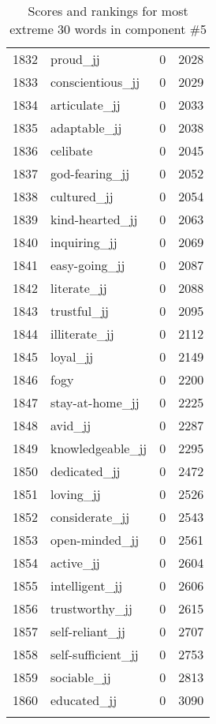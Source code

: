 \begin{longtable}[!htbp]{| rlr@{.}l |}
    1832 & proud\_jj & 0 & 2028 \\
    1833 & conscientious\_jj & 0 & 2029 \\
    1834 & articulate\_jj & 0 & 2033 \\
    1835 & adaptable\_jj & 0 & 2038 \\
    1836 & celibate & 0 & 2045 \\
    1837 & god-fearing\_jj & 0 & 2052 \\
    1838 & cultured\_jj & 0 & 2054 \\
    1839 & kind-hearted\_jj & 0 & 2063 \\
    1840 & inquiring\_jj & 0 & 2069 \\
    1841 & easy-going\_jj & 0 & 2087 \\
    1842 & literate\_jj & 0 & 2088 \\
    1843 & trustful\_jj & 0 & 2095 \\
    1844 & illiterate\_jj & 0 & 2112 \\
    1845 & loyal\_jj & 0 & 2149 \\
    1846 & fogy & 0 & 2200 \\
    1847 & stay-at-home\_jj & 0 & 2225 \\
    1848 & avid\_jj & 0 & 2287 \\
    1849 & knowledgeable\_jj & 0 & 2295 \\
    1850 & dedicated\_jj & 0 & 2472 \\
    1851 & loving\_jj & 0 & 2526 \\
    1852 & considerate\_jj & 0 & 2543 \\
    1853 & open-minded\_jj & 0 & 2561 \\
    1854 & active\_jj & 0 & 2604 \\
    1855 & intelligent\_jj & 0 & 2606 \\
    1856 & trustworthy\_jj & 0 & 2615 \\
    1857 & self-reliant\_jj & 0 & 2707 \\
    1858 & self-sufficient\_jj & 0 & 2753 \\
    1859 & sociable\_jj & 0 & 2813 \\
    1860 & educated\_jj & 0 & 3090 \\
    \hline
    \caption{Scores and rankings for most extreme 30 words in component \#5} \\
\end{longtable}
